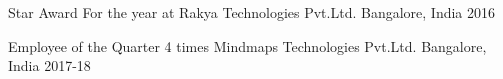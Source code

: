 




\begin{cvhonors}

  \cvhonor
    {Star Award } %
    {For the year at Rakya Technologies Pvt.Ltd. } %
    {Bangalore, India} %
    {2016} %

  \cvhonor
    {Employee of the Quarter 4 times} %
    {Mindmaps Technologies Pvt.Ltd.} %
    {Bangalore, India} %
    {2017-18} %

\end{cvhonors}



